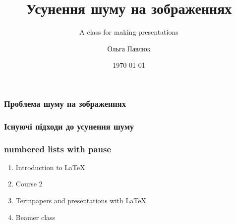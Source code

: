\documentclass[12pt]{beamer}
\title{Усунення шуму на зображеннях}
\author{Ольга Павлюк}
\subtitle{{ A class for making presentations}}
\institute{Національний університет "Львівська політехніка"}
\date{\today}
\begin{document}
\begin{frame}
	\titlepage
\end{frame}

\begin{frame}\frametitle{Проблема шуму на зображеннях}
\end{frame}

\begin{frame}\frametitle{Існуючі підходи до усунення шуму}
\end{frame}

\begin{frame}\frametitle{}
\end{frame}

\begin{frame}\frametitle{}
\end{frame}

\begin{frame}\frametitle{}
\end{frame}

\begin{frame}\frametitle{}
\end{frame}

\begin{frame}\frametitle{}
\end{frame}

\begin{frame}\frametitle{}
\end{frame}

\begin{frame}\frametitle{}
\end{frame}

\begin{frame}\frametitle{}
\end{frame}

\begin{frame}\frametitle{numbered lists with pause}
	\begin{enumerate}
		\item Introduction to  \LaTeX \pause 
		\item Course 2 \pause 
		\item Termpapers and presentations with \LaTeX \pause 
		\item Beamer class
	\end{enumerate}
\end{frame}
\end{document}
